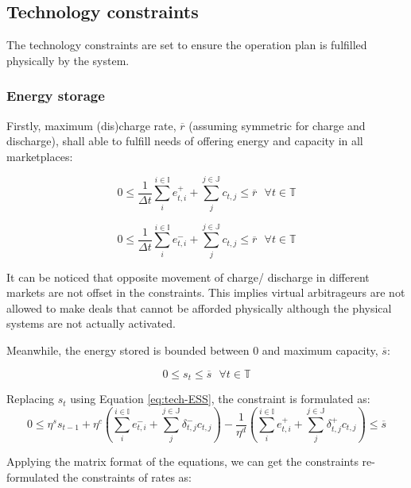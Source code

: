 \subsection{Technology constraints}
\label{sec:tech-constraints}
The technology constraints are set to ensure the operation plan is fulfilled physically by the system.

\subsubsection{Energy storage}
Firstly, maximum (dis)charge rate, $\overline{r}$ (assuming symmetric for charge and discharge), shall able to fulfill needs of offering energy and capacity in all marketplaces:

\begin{equation*}
0 \leq \frac{1}{\Delta t}\sum_{i}^{i \in \mathbb{I}} e^{+}_{t,i} + \sum_{j}^{j \in \mathbb{J}} c_{t,j} \leq \overline{r}~~~ \forall t \in \mathbb{T}
\end{equation*}

\begin{equation*}
0 \leq \frac{1}{\Delta t}\sum_{i}^{i \in \mathbb{I}} e^{-}_{t,i} + \sum_{j}^{j \in \mathbb{J}} c_{t,j} \leq \overline{r}~~~ \forall t \in \mathbb{T}
\end{equation*}

It can be noticed that opposite movement of charge/ discharge in different markets are not offset in the constraints. This implies virtual arbitrageurs are not allowed to make deals that cannot be afforded physically although the physical systems are not actually activated.

Meanwhile, the energy stored is bounded between 0 and maximum capacity, $\overline{s}$:

\begin{equation*}
0 \leq s_t \leq \overline{s}~~~ \forall t \in \mathbb{T}
\end{equation*}

Replacing $s_t$ using Equation \eqref{eq:tech-ESS}, the constraint is formulated as:
\begin{equation*}
0 \leq \eta^s s_{t-1} + \eta^c \left(\sum_{i}^{i \in \mathbb{I}} e^{-}_{t,i}  + \sum_{j}^{j \in \mathbb{J}} \delta_{t,j}^- c_{t,j}\right)- \frac{1}{\eta^d} \left( \sum_{i}^{i \in \mathbb{I}} e^{+}_{t,i} +\sum_{j}^{j \in \mathbb{J}} \delta_{t,j}^{+}c_{t,j}\right) \leq \overline{s}
\end{equation*}

Applying the matrix format of the equations, we can get the constraints re-formulated the constraints of rates as:

